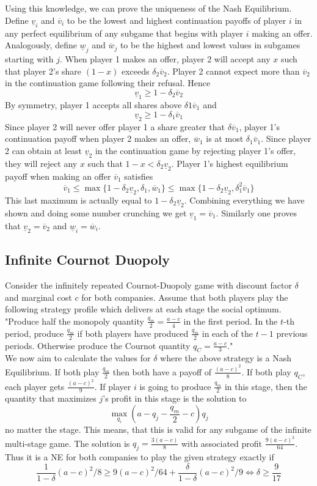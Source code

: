\documentclass[a4paper, 12pt]{article}
\theoremstyle{plain}
\theoremstyle{definition}
\theoremstyle{lemma}
\theoremstyle{remark}
\theoremstyle{corollary}
\theoremstyle{example}
\begin{document}
	Using this knowledge, we can prove the uniqueness of the Nash Equilibrium. Define $\underline{v}_i$ and $\overline{v}_i$ to be the lowest and highest continuation payoffs of player $i$ in any perfect equilibrium of any subgame that begins with player $i$ making an offer. Analogously, define $\underline{w}_j$ and $\overline{w}_j$ to be the highest and lowest values in subgames starting with $j$. When player 1 makes an offer, player 2 will accept any $x$ such that player 2's share $(1-x)$ exceeds $\delta_2\overline{v}_2$. Player 2 cannot expect more than $\overline{v}_2$ in the continuation game following their refusal. Hence \[\underline{v}_1 \geq 1-\delta_2\overline{v}_2\] By symmetry, player 1 accepts all shares above $\delta1\overline{v}_1$ and \[\underline{v}_2 \geq 1-\delta_1 \overline{v}_1\] Since player 2 will never offer player 1 a share greater that $\delta\overline{v}_1$, player 1's continuation payoff when player 2 makes an offer, $\overline{w}_1$ is at most $\delta_1\overline{v}_1$. Since player 2 can obtain at least $\underline{v}_2$ in the continuation game by rejecting player 1's offer, they will reject any $x$ such that $1-x < \delta_2\underline{v}_2$. Player 1's highest equilibrium payoff when making an offer $\overline{v}_1$ satisfies \[\overline{v}_1 \leq \max\{1-\delta_2\underline{v}_2, \delta_1,\overline{w}_1\} \leq \max\{1-\delta_2\underline{v}_2,\delta_1^2\overline{v}_1\}\] This last maximum is actually equal to $1-\delta_2\underline{v}_2$. Combining everything we have shown and doing some number crunching we get $\underline{v}_1 = \overline{v}_1$. Similarly one proves that $\underline{v}_2 = \overline{v}_2$ and $\underline{w}_i = \overline{w}_i$.
	\subsection{Infinite Cournot Duopoly}
	Consider the infinitely repeated Cournot-Duopoly game with discount factor $\delta$ and marginal cost $c$ for both companies. Assume that both players play the following strategy profile which delivers at each stage the social optimum.
	"Produce half the monopoly quantity $\frac{q_m}{2} = \frac{a-c}{4}$ in the first period. In the $t$-th period, produce $\frac{q_m}{2}$ if both players have produced $\frac{q_m}{2}$ in each of the $t-1$ previous periods. Otherwise produce the Cournot quantity $q_C = \frac{a-c}{3}$."\\
	We now aim to calculate the values for $\delta$ where the above strategy is a Nash Equilibrium. If both play $\frac{q_m}{2}$ then both have a payoff of $\frac{(a-c)^2}{8}$. If both play $q_C$, each player gets $\frac{(a-c)^2}{9}$. If player $i$ is going to produce $\frac{q_m}{2}$ in this stage, then the quantity that maximizes $j$'s profit in this stage is the solution to \[\max_{q_i} \left(a-q_j-\frac{q_m}{2}-c\right)q_j\] no matter the stage. This means, that this is valid for any subgame of the infinite multi-stage game. The solution is $q_j = \frac{3(a-c)}{8}$ with associated profit $\frac{9(a-c)^2}{64}$. Thus it is a NE for both companies to play the given strategy exactly if \[\frac{1}{1-\delta} (a-c)^2/8 \geq 9(a-c)^2/64 + \frac{\delta}{1-\delta}(a-c)^2/9 \Leftrightarrow \delta \geq \frac{9}{17}\]
\end{document}
